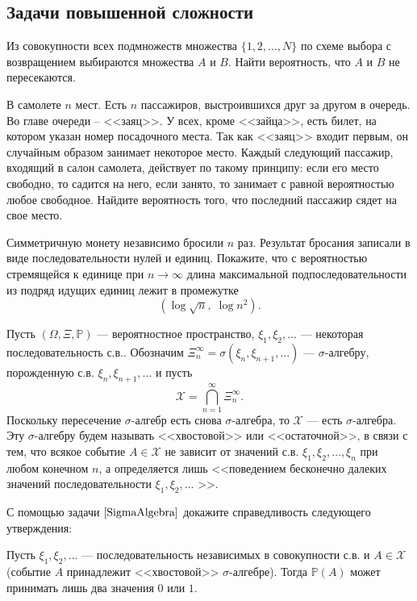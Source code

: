 \subsection{Задачи повышенной сложности}

\begin{problem}
Из совокупности всех подмножеств множества $\{1,2,\ldots,N\}$ по схеме выбора с возвращением выбираются множества $A$ и $B$. 
Найти вероятность, что $A$ и $B$ не пересекаются. 
\end{problem}

\begin{problem}
В самолете $n$ мест. Есть $n$ пассажиров, выстроившихся друг за другом в очередь. Во главе очереди -- <<заяц>>. У всех, 
кроме <<зайца>>, есть билет, на котором указан номер посадочного места. Так как <<заяц>> входит первым, он случайным образом занимает 
некоторое место. Каждый следующий пассажир, входящий в салон самолета, действует по такому принципу: если его место свободно, то 
садится на него, если занято, то занимает с равной вероятностью любое свободное. Найдите вероятность того, что последний пассажир 
сядет на свое место. 
\end{problem}


\begin{problem}
Симметричную монету независимо бросили $n$ раз. Результат бросания записали в виде последовательности нулей и единиц. Покажите, что с вероятностью стремящейся к единице при $n\to \infty $ длина максимальной подпоследовательности из подряд идущих единиц лежит в промежутке
\[\left(\log \sqrt{n} ,\; \log n^{2} \right).\] 
\end{problem}

\begin{problem}
Пусть $(\Omega,\Xi,{\mathbb P})$ --- вероятностное пространство, $\xi_1,\xi_2,\ldots$ --- некоторая последовательность с.в.. 
Обозначим $\Xi_n^{\infty}=\sigma(\xi_{n},\xi_{n+1},\ldots)$ --- $\sigma$-алгебру, порожденную с.в. $\xi_{n},\xi_{n+1},\ldots$ и пусть 
$$
{\mathcal X}=\bigcap\limits_{n=1}^{\infty} \Xi_{n}^{\infty} . 
$$
Поскольку пересечение $\sigma$-алгебр есть снова $\sigma$-алгебра, то ${\mathcal X}$ --- есть $\sigma$-алгебра. Эту $\sigma$-алгебру 
будем называть <<хвостовой>> или <<остаточной>>, в связи с тем, что всякое событие $A\in{\mathcal X}$ не зависит от значений с.в. 
$\xi_1,\xi_2,\ldots,\xi_n$ при любом конечном $n$, а определяется лишь <<поведением бесконечно далеких значений последовательности 
$\xi_1,\xi_2,\ldots$ >>. 

С помощью задачи $\ref{SigmaAlgebra}$ докажите справедливость следующего утверждения: 

Пусть $\xi_1,\xi_2,\ldots$ --- последовательность независимых в совокупности с.в. и $A\in{\mathcal X}$ 
(событие $A$ принадлежит <<хвостовой>> $\sigma$-алгебре). Тогда ${\mathbb P}(A)$ может принимать лишь два значения $0$ или $1$. 
\end{problem}

